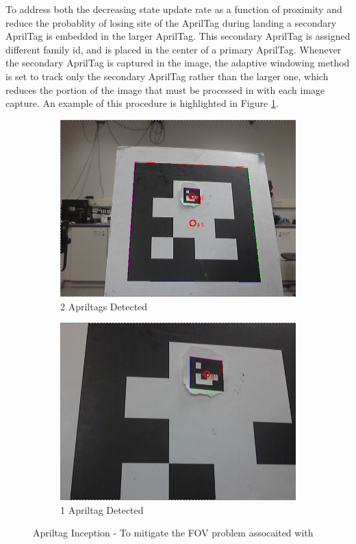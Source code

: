 \documentclass[11pt, twocolumn]{article}
\begin{document}
To address both the decreasing state update rate as a function of proximity and reduce the probablity of losing site of the AprilTag during landing a secondary AprilTag is embedded in the larger AprilTag. This secondary AprilTag is assigned different family id, and is placed in the center of a primary AprilTag. Whenever the secondary AprilTag is captured in the image, the adaptive windowing method is set to track only the secondary AprilTag rather than the larger one, which reduces the portion of the image that must be processed in with each image capture. An example of this procedure is highlighted in Figure \ref{fig:apriltagInception}.

\begin{figure}[H]
	\centering
	\begin{subfigure}[b]{0.45\linewidth}
		\includegraphics[width=\textwidth]{images/apriltags_1.png}
		\caption{2 Apriltags Detected}
	\end{subfigure}
	\begin{subfigure}[b]{0.45\linewidth}
		\includegraphics[width=\textwidth]{images/apriltags_3.png}
		\caption{1 Apriltag Detected }
	\end{subfigure}
	\caption{Apriltag Inception - To mitigate the FOV problem assocaited with }
	\label{fig:apriltagInception}
\end{figure}
\end{document}
